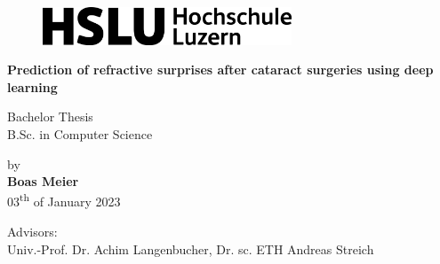 \thispagestyle{empty}
\begin{figure}[ht]
    \includegraphics[width=20em,height=\textheight,keepaspectratio]{images/hslu_2022_logo.png}
\end{figure}
\vspace*{9em}

\noindent\begin{center}
\huge{\textbf{Prediction of refractive surprises after cataract surgeries using deep learning}}\\
\vspace*{3em}

\Large{Bachelor Thesis}\\
\Large{B.Sc. in Computer Science}\\
\vspace*{4em}

\Large{by}\\
\Large{\textbf{Boas Meier}}\\
\Large{03\textsuperscript{th} of January 2023}\\
\vspace*{\fill}

\large{Advisors:\\Univ.-Prof. Dr. Achim Langenbucher, Dr. sc. ETH Andreas Streich}
\end{center}